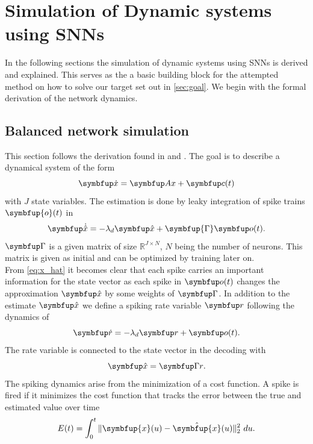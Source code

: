 \section{Simulation of Dynamic systems using \acp{SNN}}\label{sec:simulation}
In the following sections the simulation of dynamic systems using \acp{SNN} is derived and explained. This serves as the a basic building block for the attempted method on how to solve our target set out in \cref{sec:goal}. We begin with the formal derivation of the network dynamics.

\subsection{Balanced network simulation}\label{ssec:balanced_network_sim}
This section follows the derivation found in \cite{boerlin_predictive_2013} and \cite{huang_dynamics_2019}.
The goal is to describe a dynamical system of the form
\begin{equation}\label{eq:x}
\bmu{\dot{x}} = \bmu{Ax} + \bmu{c}(t)
\end{equation}
with $J$ state variables.
The estimation is done by leaky integration of spike trains $\symbfup{o}(t)$ in
\begin{equation}\label{eq:x_hat}
\bmu{\dot{\hat{x}}} = -\lambda_d \bmu{\hat{x}} + \symbfup{\Gamma} \bmu{o}(t).
\end{equation}
$\bmu{\Gamma}$ is a given matrix of size $\mathbb{R}^{J\times N}$, $N$ being the number of neurons. This matrix is given as initial and can be optimized by training later on\cite{brendel_learning_2020}.\\
From \cref{eq:x_hat} it becomes clear that each spike carries an important information for the state vector as each spike in $\bmu{o}(t)$ changes the approximation $\bmu{\hat{x}}$ by some weights of $\bmu{\Gamma}$.
In addition to the estimate $\bmu{\hat{x}}$ we define a spiking rate variable $\bmu{r}$ following the dynamics of
\begin{equation}\label{eq:rate}
\bmu{\dot{r}} = -\lambda_d\bmu{r} + \bmu{o}(t).
\end{equation}
The rate variable is connected to the state vector in the decoding with
\begin{equation}\label{eq:decoding}
	\bmu{\hat{x}} = \bmu{\Gamma r}.
\end{equation}
The spiking dynamics arise from the minimization of a cost function. A spike is fired if it minimizes the cost function that tracks the error between the true and estimated value over time
\begin{equation}\label{eq:cost_func_basic}
E(t)=\int_0^t \|\symbfup{x}(u)-\hat{\symbfup{x}}(u)\|_2^2 \ du.
\end{equation}


